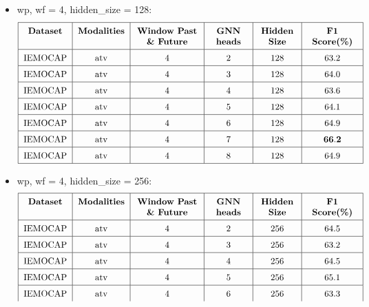 \documentclass[a4paper]{article}
\begin{document}
\begin{itemize}
    \item wp, wf = 4, hidden\_size = 128:
        \[
        \renewcommand{\arraystretch}{1.5}
        \begin{tabular}{|c|c|p{2.5cm}<{\centering}|p{1.5cm}<{\centering}|p{1.5cm}<{\centering}|p{2cm}<{\centering}|}
            \hline
            \textbf{Dataset} & \textbf{Modalities} & \textbf{Window Past \& Future} & \textbf{GNN heads} & \textbf{Hidden Size} & \textbf{F1 Score(\%)} \\
            \hline
            \text{IEMOCAP} & \text{atv} & 4 & 2 & 128 & 63.2 \\
            \hline
            \text{IEMOCAP} & \text{atv} & 4 & 3 & 128 & 64.0 \\
            \hline
            \text{IEMOCAP} & \text{atv} & 4 & 4 & 128 & 63.6 \\
            \hline
            \text{IEMOCAP} & \text{atv} & 4 & 5 & 128 & 64.1 \\
            \hline
            \text{IEMOCAP} & \text{atv} & 4 & 6 & 128 & 64.9 \\
            \hline
            \text{IEMOCAP} & \text{atv} & 4 & 7 & 128 & \(\mathbf{66.2}\) \\
            \hline
            \text{IEMOCAP} & \text{atv} & 4 & 8 & 128 & 64.9 \\
            \hline
        \end{tabular}    
        \]
    \item wp, wf = 4, hidden\_size = 256:
        \[
        \renewcommand{\arraystretch}{1.5}
        \begin{tabular}{|c|c|p{2.5cm}<{\centering}|p{1.5cm}<{\centering}|p{1.5cm}<{\centering}|p{2cm}<{\centering}|}
            \hline
            \textbf{Dataset} & \textbf{Modalities} & \textbf{Window Past \& Future} & \textbf{GNN heads} & \textbf{Hidden Size} & \textbf{F1 Score(\%)} \\
            \hline
            \text{IEMOCAP} & \text{atv} & 4 & 2 & 256 & 64.5 \\
            \hline
            \text{IEMOCAP} & \text{atv} & 4 & 3 & 256 & 63.2 \\
            \hline
            \text{IEMOCAP} & \text{atv} & 4 & 4 & 256 & 64.5 \\
            \hline
            \text{IEMOCAP} & \text{atv} & 4 & 5 & 256 & 65.1 \\
            \hline
            \text{IEMOCAP} & \text{atv} & 4 & 6 & 256 & 63.3 \\

\end{tabular}\]
\end{itemize}
\end{document}
